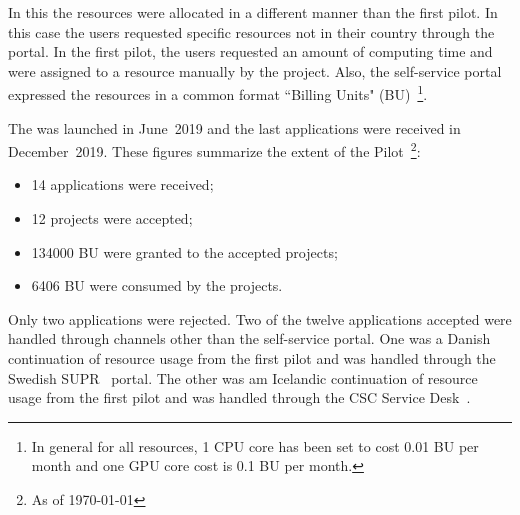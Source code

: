 \newcommand{\BUcons}{6406\xspace}
\newcommand{\BUreq}{134000\xspace}

In this \pilot the resources were allocated in a different manner than the first pilot.
In this case the users requested specific resources not in their country through the portal. 
In the first pilot, the users requested an amount of computing time and were assigned to a resource manually by the \dell project.
Also, the self-service portal expressed the \einfra resources in a common format ``Billing Units" (BU)~\footnote{In general for all \dell resources, 1 CPU core has been set to cost 0.01 BU per month and one GPU core cost is 0.1 BU per month.}.

The \dell \pilot was launched in June~2019 and the last applications were received in December~2019. 
These figures summarize the extent of the Pilot~\footnote{As of \today}:
\begin{itemize}
\item 14 applications were received;
\item 12 projects were accepted;
\item \BUreq BU were granted to the accepted projects;
\item \BUcons BU were consumed by the projects.
\end{itemize}
Only two applications were rejected. 
Two of the twelve applications accepted were handled through channels other than the self-service portal.
One was a Danish continuation of resource usage from the first \dell pilot and was handled through the Swedish SUPR~\cite{supr} portal.
The other was am Icelandic continuation of resource usage from the first \dell pilot and was handled through the CSC Service Desk~\cite{csc-service-desk}.

